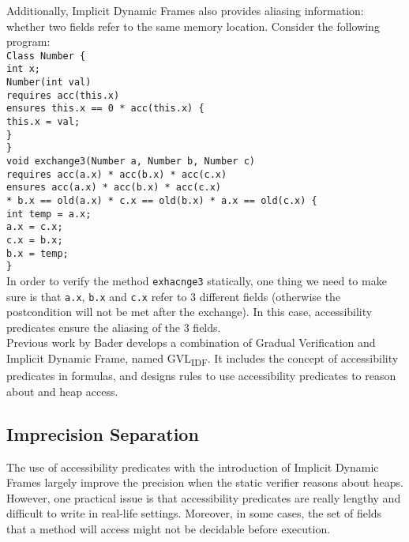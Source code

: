 \documentclass {article}
\begin{document}
Additionally, Implicit Dynamic Frames also provides aliasing information: whether two fields refer to the same memory location. Consider the following program:\\
\texttt{\noindent Class Number \{  \\
\setlength\parindent{24pt}
\indent int x;\\
\indent Number(int val) \\
\indent \indent requires acc(this.x)\\
\indent \indent ensures this.x == 0 * acc(this.x) \{\\
\indent \indent this.x = val;\\
\indent \}\\
\} \\
void exchange3(Number a, Number b, Number c)\\
\indent requires acc(a.x) * acc(b.x) * acc(c.x)\\
\indent ensures acc(a.x) * acc(b.x) * acc(c.x) \\
\indent \hspace{12mm} * b.x == old(a.x) *  c.x == old(b.x) *  a.x == old(c.x) \{\\
\indent int temp = a.x;\\
\indent a.x = c.x;\\
\indent c.x = b.x;\\
\indent b.x = temp;\\
\}\\
}
\setlength\parindent{0pt}
In order to verify the method \texttt{exhacnge3} statically, one thing we need to make sure is that \texttt{a.x}, \texttt{b.x} and \texttt{c.x} refer to 3 different fields (otherwise the postcondition will not be met after the exchange). In this case, accessibility predicates ensure the aliasing of the 3 fields.\\ 

Previous work by Bader \cite{p1} develops a combination of Gradual Verification and Implicit Dynamic Frame, named GVL\textsubscript{IDF}. It includes the concept of accessibility predicates in formulas, and designs rules to use accessibility predicates to reason about and heap access.
\subsection{Imprecision Separation}
The use of accessibility predicates with the introduction of Implicit Dynamic Frames largely improve the precision when the static verifier reasons about heaps. However, one practical issue is that accessibility predicates are really lengthy and difficult to write in real-life settings. Moreover, in some cases, the set of fields that a method will access might not be decidable before execution.\\ 
\end{document}
